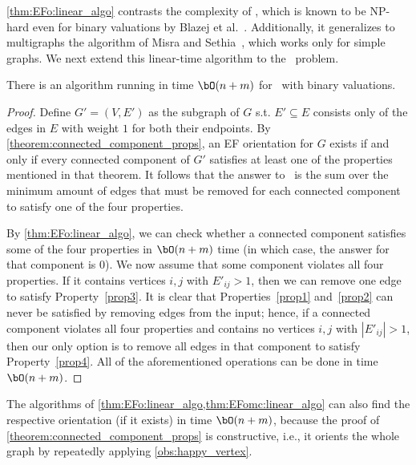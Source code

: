 \documentclass[11pt,letterpaper]{article}
\begin{document}
\cref{thm:EFo:linear_algo} contrasts the complexity of \EFXo, which is known to be NP-hard even for binary valuations by Blazej et al.~\cite{sagt/BlazejGRS25}.
Additionally, it generalizes to multigraphs the algorithm of Misra and Sethia~\cite{aldt/MisraS24}, which works only for simple graphs.
We next extend this linear-time algorithm to the \EFmc\ problem.


\begin{theoremrep}[\appsymb]\label{thm:EFomc:linear_algo}
    There is an algorithm running in time $\bO(n+m)$ for \EFmc\ with binary valuations.
\end{theoremrep}

\begin{proof}
    Define $G'=(V,E')$ as the subgraph of $G$ s.t. $E'\subseteq E$ consists only of the edges in $E$ with weight $1$ for both their endpoints. By \cref{theorem:connected_component_props}, an EF orientation for $G$ exists if and only if every connected component of $G'$ satisfies at least one of the properties mentioned in that theorem. It follows that the answer to \EFmc\ is the sum over the minimum amount of edges that must be removed for each connected component to satisfy one of the four properties.

    By \cref{thm:EFo:linear_algo}, we can check whether a connected component satisfies some of the four properties in $\bO(n+m)$ time (in which case, the answer for that component is $0$). We now assume that some component violates all four properties. If it contains vertices $i,j$ with $E'_{ij}>1$, then we can remove one edge to satisfy Property~\ref{prop3}. It is clear that Properties~\ref{prop1} and~\ref{prop2} can never be satisfied by removing edges from the input; hence, if a connected component violates all four properties and contains no vertices $i,j$ with $|E'_{ij}|>1$, then our only option is to remove all edges in that component to satisfy Property~\ref{prop4}. All of the aforementioned operations can be done in time $\bO(n+m)$.
\end{proof}

\begin{remark}
    The algorithms of \cref{thm:EFo:linear_algo,thm:EFomc:linear_algo} can also find the respective orientation (if it exists) in time $\bO(n+m)$, because the proof of \cref{theorem:connected_component_props} is constructive, i.e., it orients the whole graph by repeatedly applying \cref{obs:happy_vertex}.
\end{remark}
\end{document}
